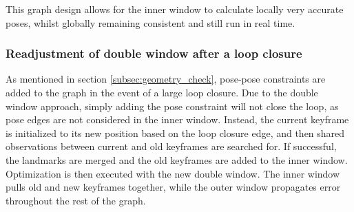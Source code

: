 This graph design allows for the inner window to calculate locally very accurate poses, whilst globally remaining consistent and still run in real time.

\subsubsection{Readjustment of double window after a loop closure}
As mentioned in section \ref{subsec:geometry_check}, pose-pose constraints are added to the graph in the event of a large loop closure. Due to the double window approach, simply adding the pose constraint will not close the loop, as pose edges are not considered in the inner window.  Instead, the current keyframe is initialized to its new position based on the loop closure edge, and then shared observations between current and old keyframes are searched for.  If successful, the landmarks are merged and the old keyframes are added to the inner window.  Optimization is then executed with the new double window.  The inner window pulls old and new keyframes together, while the outer window propagates error throughout the rest of the graph.


%
